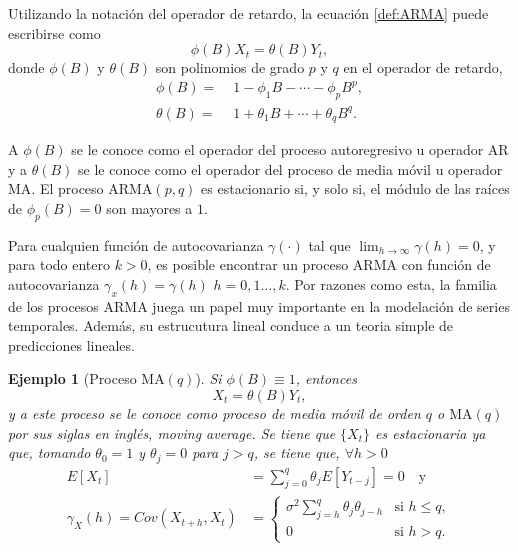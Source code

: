 \documentclass[12pt,twoside]{article}
\newtheorem{example}[theorem]{Ejemplo}
\newcommand{\ma}{\text{MA}}
\newcommand{\arma}{\text{ARMA}}
\begin{document}
Utilizando la notación del operador de retardo, la ecuación \eqref{def:ARMA} puede escribirse como
\begin{equation}\label{eq:ARMA_lag_op}
    \phi(B)X_t = \theta(B)Y_t,
\end{equation}
donde $\phi(B)$ y $\theta(B)$ son polinomios de grado $p$ y $q$ en el operador de retardo,
\begin{align}
    \phi(B) =& \;1 - \phi_1 B - \dotsb - \phi_p B^p \label{eq:ar_lag_op}, \\
    \theta(B) =&\; 1 +\theta_1 B + \dotsb + \theta_q B^q \label{eq:ma_lag_op}.
\end{align}

A $\phi(B)$ se le conoce como el operador del proceso autoregresivo u operador AR y a $\theta(B)$ se le conoce como el operador del proceso de media móvil u operador MA. El proceso $\arma(p,q)$ es estacionario si, y solo si, el módulo de las raíces de $\phi_p(B) = 0$ son mayores a $1$.

Para cualquien función de autocovarianza $\gamma(\cdot)$ tal que $\lim_{h\rightarrow\infty} \gamma(h) = 0$, y para todo entero $k>0$, es posible encontrar un proceso ARMA con función de autocovarianza $\gamma_x(h) = \gamma(h)$ $h=0,1\dotsc,k$. Por razones como esta, la familia de los procesos ARMA juega un papel muy importante en la modelación de series temporales. Además, su estrucutura lineal conduce a un teoria simple de predicciones lineales.

\begin{example}[Proceso $\ma(q)$]
    Si $\phi(B) \equiv 1$, entonces
    \begin{equation}\label{eq:ma_process}
        X_t = \theta(B)Y_t,
    \end{equation}
    y a este proceso se le conoce como proceso de media móvil de orden $q$ o $\ma(q)$ por sus siglas en inglés, \emph{moving average}. Se tiene que $\{X_t\}$ es estacionaria ya que, tomando $\theta_0 = 1$ y $\theta_j = 0$ para $j > q$, se tiene que, $\forall h > 0$
    \begin{align*}
        E[X_t] & = \sum_{j=0}^q \theta_j E[Y_{t-j}] = 0 \quad \text{y}\\
        \gamma_X(h) = Cov(X_{t+h}, X_t) & = \left\{\begin{array}{ll}
            \sigma^2 \sum_{j=h}^{q} \theta_j \theta_{j - h} & \text{si } h \leq q,  \\
            0 & \text{si } h > q.
        \end{array}\right.
    \end{align*}
\end{example}
\end{document}
